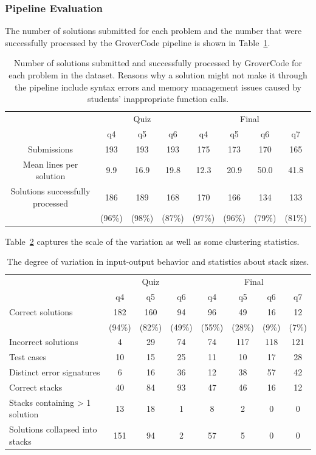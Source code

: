 \subsubsection{Pipeline Evaluation}

The number of solutions submitted for each problem and the number that were successfully processed by the GroverCode pipeline is shown in Table~\ref{table:num_submissions}.

\begin{table}[h!]
\centering
\begin{tabular}{|c|c|c|c|c|c|c|c|}
\hline
& \multicolumn{3}{c|}{Quiz} & \multicolumn{4}{c|}{Final} \\
\cline{2-8}
& q4 & q5 & q6 & q4 & q5 & q6 & q7 \\
\hline
Submissions & 193 & 193 & 193 & 175 & 173 & 170 & 165 \\
\hline
Mean lines per solution & 9.9 & 16.9 & 19.8 & 12.3 & 20.9 & 50.0 & 41.8 \\
\hline
Solutions successfully processed & 186 & 189 & 168  & 170 & 166  & 134 & 133 \\
 & (96\%) & (98\%) & (87\%) & (97\%) & (96\%) & (79\%) & (81\%) \\
\hline
\end{tabular}
\caption{Number of solutions submitted and successfully processed by GroverCode for each problem in the dataset. Reasons why a solution might not make it through the pipeline include syntax errors and memory management issues caused by students' inappropriate function calls.}
\label{table:num_submissions}
\end{table}



Table~\ref{table:cluster_stats} captures the scale of the variation as well as some clustering statistics.

\begin{table}[!ht]
\centering
\begin{tabular}{|l|c|c|c|c|c|c|c|}
\hline
& \multicolumn{3}{c|}{Quiz} & \multicolumn{4}{c|}{Final} \\
\cline{2-8}
& q4 & q5 & q6 & q4 & q5 & q6 & q7 \\
\hline
Correct solutions & 182 & 160 & 94 & 96 & 49 & 16 & 12 \\
 & (94\%) & (82\%) & (49\%) & (55\%) & (28\%) & (9\%) & (7\%) \\
\hline
Incorrect solutions & 4 & 29 & 74 & 74 & 117 & 118 & 121 \\
\hline
Test cases & 10 & 15 & 25 & 11 & 10 & 17 & 28 \\
\hline
Distinct error signatures & 6 & 16 & 36 & 12 & 38 & 57 & 42 \\
\hline
Correct stacks & 40 & 84 & 93 & 47 & 46 & 16 & 12 \\
\hline
Stacks containing > 1 solution & 13 & 18 & 1 & 8 & 2 & 0 & 0 \\
\hline
Solutions collapsed into stacks & 151 & 94 & 2 & 57 & 5 & 0 & 0 \\
\hline
\end{tabular}
\caption{The degree of variation in input-output behavior and statistics about stack sizes.}
\label{table:cluster_stats}
\end{table}


